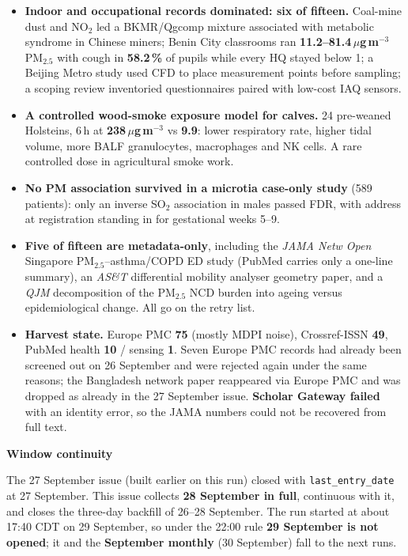 \documentclass[10pt]{article}
\begin{document}
\footnotesize
\begin{itemize}

\item \textbf{Indoor and occupational records dominated: six of fifteen.} Coal-mine dust and NO$_2$ led
a BKMR/Qgcomp mixture associated with metabolic syndrome in Chinese miners; Benin City classrooms
ran \textbf{11.2--81.4\,$\mu$g\,m$^{-3}$} PM$_{2.5}$ with cough in \textbf{58.2\,\%} of pupils while
every HQ stayed below 1; a Beijing Metro study used CFD to place measurement points before sampling;
a scoping review inventoried questionnaires paired with low-cost IAQ sensors.

\item \textbf{A controlled wood-smoke exposure model for calves.} 24 pre-weaned Holsteins, 6\,h at
\textbf{238\,$\mu$g\,m$^{-3}$} vs \textbf{9.9}: lower respiratory rate, higher tidal volume, more BALF
granulocytes, macrophages and NK cells. A rare controlled dose in agricultural smoke work.

\item \textbf{No PM association survived in a microtia case-only study} (589 patients): only an
inverse SO$_2$ association in males passed FDR, with address at registration standing in for
gestational weeks 5--9.

\item \textbf{Five of fifteen are metadata-only}, including the \textit{JAMA Netw Open} Singapore
PM$_{2.5}$--asthma/COPD ED study (PubMed carries only a one-line summary), an \textit{AS\&T}
differential mobility analyser geometry paper, and a \textit{QJM} decomposition of the PM$_{2.5}$
NCD burden into ageing versus epidemiological change. All go on the retry list.

\item \textbf{Harvest state.} Europe PMC \textbf{75} (mostly MDPI noise), Crossref-ISSN \textbf{49},
PubMed health \textbf{10} / sensing \textbf{1}. Seven Europe PMC records had already been screened
out on 26 September and were rejected again under the same reasons; the Bangladesh network paper
reappeared via Europe PMC and was dropped as already in the 27 September issue. \textbf{Scholar
Gateway failed} with an identity error, so the JAMA numbers could not be recovered from full text.

\end{itemize}

\vspace{2mm}

\begin{keybox}
{\sffamily\bfseries\footnotesize\color{Deep}Window continuity}\\[1.2mm]
{\fontsize{7.2}{8.8}\selectfont
The 27 September issue (built earlier on this run) closed with \texttt{last\_entry\_date}
at 27 September. This issue collects \textbf{28 September in full}, continuous with it, and closes
the three-day backfill of 26--28 September. The run started at about 17:40 CDT on 29 September,
so under the 22:00 rule \textbf{29 September is not opened}; it and the \textbf{September monthly}
(30 September) fall to the next runs.\par}
\end{keybox}
\end{document}
